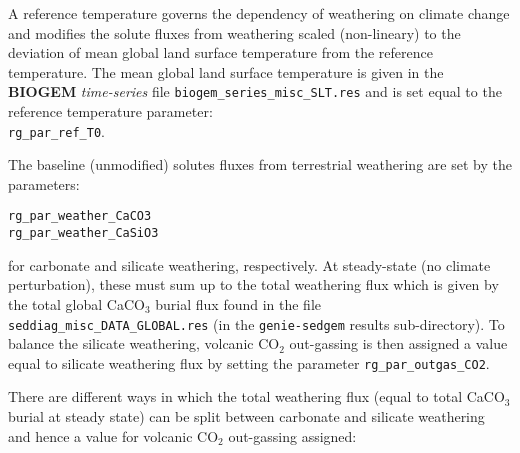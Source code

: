 \documentclass[11pt,fleqn]{book} %
\begin{document}
A reference temperature governs the dependency of weathering on climate change and modifies the solute fluxes from weathering scaled (non-lineary) to the deviation of mean global land surface temperature from the reference temperature. The mean global land surface temperature is given in the \textbf{BIOGEM} \textit{time-series} file \texttt{biogem\_series\_misc\_SLT.res} and is set equal to the reference temperature parameter:
\\\texttt{rg\_par\_ref\_T0}.

The baseline (unmodified) solutes fluxes from terrestrial weathering are set by the parameters:
\vspace{-1mm}\begin{verbatim}
rg_par_weather_CaCO3
rg_par_weather_CaSiO3
\end{verbatim}\vspace{-1mm}
for carbonate and silicate weathering, respectively. At steady-state (no climate perturbation), these must sum up to the total weathering flux which is given by the total global CaCO$_{3}$ burial flux found in the file \texttt{seddiag\_misc\_DATA\_GLOBAL.res} (in the \texttt{genie-sedgem} results sub-directory).
To balance the silicate weathering, volcanic CO$_{2}$ out-gassing is then assigned a value equal to silicate weathering flux by setting the parameter \texttt{rg\_par\_outgas\_CO2}.

There are different ways in which the total weathering flux (equal to total CaCO$_{3}$ burial at steady state) can be split between carbonate and silicate weathering and hence a value for volcanic CO$_{2}$ out-gassing assigned:
\end{document}
